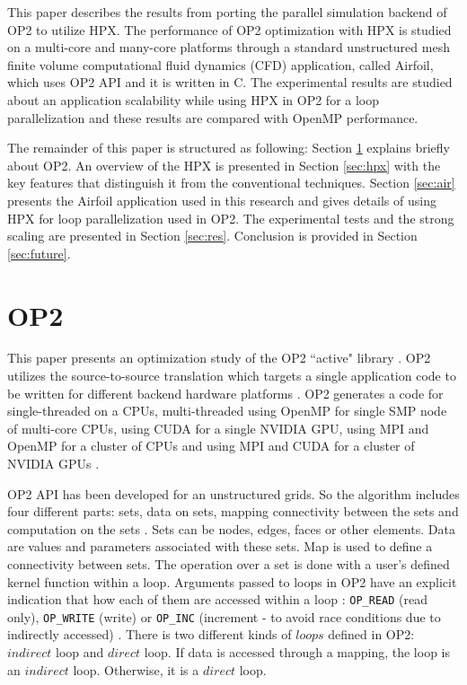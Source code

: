 \documentclass[conference]{IEEEtran}
\begin{document}
This paper describes the results from porting the parallel simulation backend of OP2 to utilize HPX. The performance of OP2 optimization with HPX is studied on a multi-core and many-core platforms through a standard unstructured mesh finite volume computational fluid dynamics (CFD) application, called Airfoil, which uses OP2 API and it is written in C. The experimental results are studied about an application scalability while using HPX in OP2 for a loop parallelization and these results are compared with OpenMP performance.

The remainder of this paper is structured as following: Section \ref{sec:op2} explains briefly about OP2. An overview of the HPX is presented in Section \ref{sec:hpx} with the key features that distinguish it from the conventional techniques. Section \ref{sec:air} presents the Airfoil application used in this research and gives details of using HPX for loop parallelization used in OP2. The experimental tests and the strong scaling are presented in Section \ref{sec:res}. Conclusion is provided in Section \ref{sec:future}.

\section{OP2}
\label{sec:op2}

This paper presents an optimization study of the OP2 ``active" library \cite{o1}. OP2 utilizes the source-to-source translation which targets a single application code to be written for different backend hardware platforms \cite{o2,o3,o4}. OP2 generates a code for single-threaded on a CPUs, multi-threaded using OpenMP for single SMP node of multi-core CPUs, using CUDA for a single NVIDIA GPU, using MPI and OpenMP for a cluster of CPUs and using MPI and CUDA for a cluster of NVIDIA GPUs \cite{o4}. 

OP2 API has been developed for an unstructured grids. So the algorithm includes four different parts: sets, data on sets, mapping connectivity between the sets and computation on the sets \cite{o2,o7}. Sets can be nodes, edges, faces or other elements. Data are values and parameters associated with these sets. Map is used to define a connectivity between sets. The operation over a set is done with a user's defined kernel function within a loop. Arguments passed to loops in OP2 have an explicit indication that how each of them are accessed within a loop : \texttt{OP\_READ} (read only), \texttt{OP\_WRITE} (write) or \texttt{OP\_INC} (increment - to avoid race conditions due to indirectly accessed) \cite{o1}. There is two different kinds of $loops$ defined in OP2: $indirect$ loop and $direct$ loop. If data is accessed through a mapping, the loop is an $indirect$ loop. Otherwise, it is a $direct$ loop. 
\end{document}
